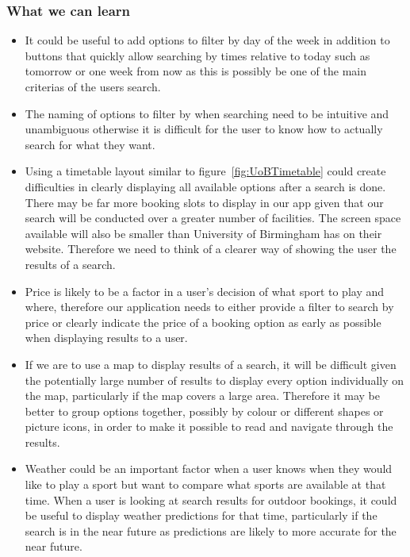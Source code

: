 \subsubsection{What we can learn}
\label{ssub:what_we_can_learn}

\begin{itemize}
	\item It could be useful to add options to filter by day of the week in
		addition to buttons that quickly allow searching by times relative to
		today such as tomorrow or one week from now as this is possibly be one
		of the main criterias of the users search.
	\item The naming of options to filter by when searching need to be
		intuitive and unambiguous otherwise it is difficult  for the user to
		know how to actually search for what they want.
	\item Using a timetable layout similar to figure~\ref{fig:UoBTimetable}
		could create difficulties in clearly displaying all available options
		after a search is done. There may be far more booking slots to display
		in our app given that our search will be conducted over a greater
		number of facilities. The screen space available will also be smaller
		than University of Birmingham has on their website. Therefore we need
		to think of a clearer way of showing the user the results of a search.
	\item Price is likely to be a factor in a user's decision of what sport to
		play and where, therefore our application needs to either provide a
		filter to search by price or clearly indicate the price of a booking
		option as early as possible when displaying results to a user.
	\item If we are to use a map to display results of a search, it will be
		difficult given the potentially large number of results to display
		every option individually on the map, particularly if the map covers a
		large area. Therefore it may be better to group options together,
		possibly by colour or different shapes or picture icons, in order to
		make it possible to read and navigate through the results.
	\item Weather could be an important factor when a user knows when they
		would like to play a sport but want to compare what sports are
		available at that time. When a user is looking at search results for
		outdoor bookings, it could be useful to display weather predictions for
		that time, particularly if the search is in the near future as
		predictions are likely to more accurate for the near future.
\end{itemize}
